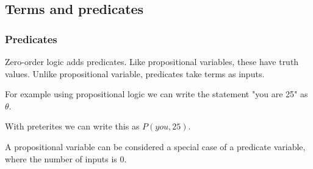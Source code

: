 
\subsection{Terms and predicates}

\subsubsection{Predicates}

Zero-order logic adds predicates. Like propositional variables, these have truth values. Unlike propositional variable, predicates take terms as inputs.

For example using propositional logic we can write the statement "you are 25" as \(\theta \).

With preterites we can write this as \(P(you, 25)\).

A propositional variable can be considered a special case of a predicate variable, where the number of inputs is \(0\).


